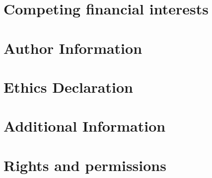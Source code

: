 \documentclass[english]{article}
\begin{document}
\section*{Competing financial interests}

\section*{Author Information}

\section*{Ethics Declaration}

\section*{Additional Information}

\section*{Rights and permissions}


\end{document}
